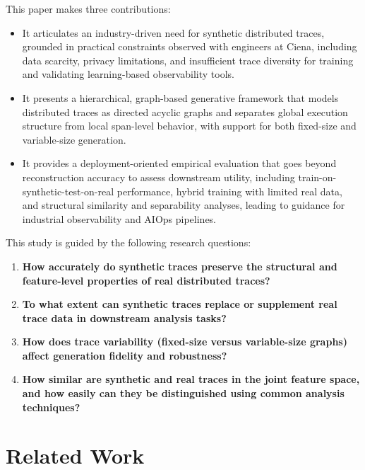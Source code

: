 \documentclass[sigconf,review]{acmart}
\begin{document}
This paper makes three contributions:
\begin{itemize}
    \item It articulates an industry-driven need for synthetic distributed traces, grounded in practical constraints observed with engineers at Ciena, including data scarcity, privacy limitations, and insufficient trace diversity for training and validating learning-based observability tools.
    \item It presents a hierarchical, graph-based generative framework that models distributed traces as directed acyclic graphs and separates global execution structure from local span-level behavior, with support for both fixed-size and variable-size generation.
    \item It provides a deployment-oriented empirical evaluation that goes beyond reconstruction accuracy to assess downstream utility, including train-on-synthetic-test-on-real performance, hybrid training with limited real data, and structural similarity and separability analyses, leading to guidance for industrial observability and AIOps pipelines.
\end{itemize}
This study is guided by the following research questions:

\begin{enumerate}
    \item[\textbf{RQ1)}] \textbf{How accurately do synthetic traces preserve the structural and feature-level properties of real distributed traces?}
    \item[\textbf{RQ2)}] \textbf{To what extent can synthetic traces replace or supplement real trace data in downstream analysis tasks?}
    \item[\textbf{RQ3)}] \textbf{How does trace variability (fixed-size versus variable-size graphs) affect generation fidelity and robustness?}
    \item[\textbf{RQ4)}] \textbf{How similar are synthetic and real traces in the joint feature space, and how easily can they be distinguished using common analysis techniques?}
\end{enumerate}



\section{Related Work}
\label{sec:related}
\end{document}
